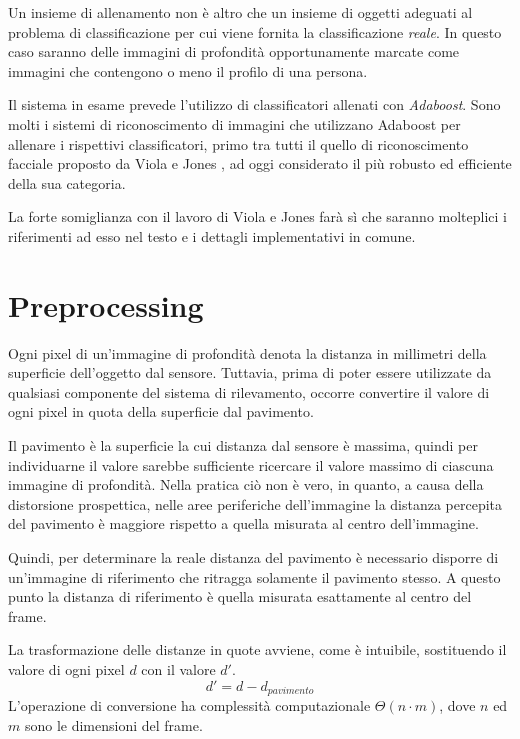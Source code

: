 Un insieme di allenamento non è altro che un insieme di oggetti adeguati al problema di classificazione per cui viene fornita la classificazione \emph{reale}.
In questo caso saranno delle immagini di profondità opportunamente marcate come immagini che contengono o meno il profilo di una persona.

Il sistema in esame prevede l'utilizzo di classificatori allenati con \emph{Adaboost}. Sono molti i sistemi di riconoscimento di immagini che utilizzano Adaboost per allenare i rispettivi classificatori, primo tra tutti il quello di riconoscimento facciale proposto da Viola e Jones \cite{Viola04}, ad oggi considerato il più robusto ed efficiente della sua categoria.

La forte somiglianza con il lavoro di Viola e Jones farà sì che saranno molteplici i riferimenti ad esso nel testo e i dettagli implementativi in comune.


\section{Preprocessing}
\label{sec:preprocessing}
Ogni pixel di un'immagine di profondità denota la distanza in millimetri della superficie dell'oggetto dal sensore. Tuttavia, prima di poter essere utilizzate da qualsiasi componente del sistema di rilevamento, occorre convertire il valore di ogni pixel in quota della superficie dal pavimento.

Il pavimento è la superficie la cui distanza dal sensore è massima, quindi per individuarne il valore sarebbe sufficiente ricercare il valore massimo di ciascuna immagine di profondità.
Nella pratica ciò non è vero, in quanto, a causa della distorsione prospettica, nelle aree periferiche dell'immagine la distanza percepita del pavimento è maggiore rispetto a quella misurata al centro dell'immagine.

Quindi, per determinare la reale distanza del pavimento è necessario disporre di un'immagine di riferimento che ritragga solamente il pavimento stesso. A questo punto la distanza di riferimento è quella misurata esattamente al centro del frame.

La trasformazione delle distanze in quote avviene, come è intuibile, sostituendo il valore di ogni pixel $d$ con il valore $d'$.
\begin{equation}
    d' = d - d_{pavimento}
    \label{eq:floor_distance}
\end{equation}
L'operazione di conversione ha complessità computazionale $\Theta(n \cdot m)$, dove $n$ ed $m$ sono le dimensioni del frame.
